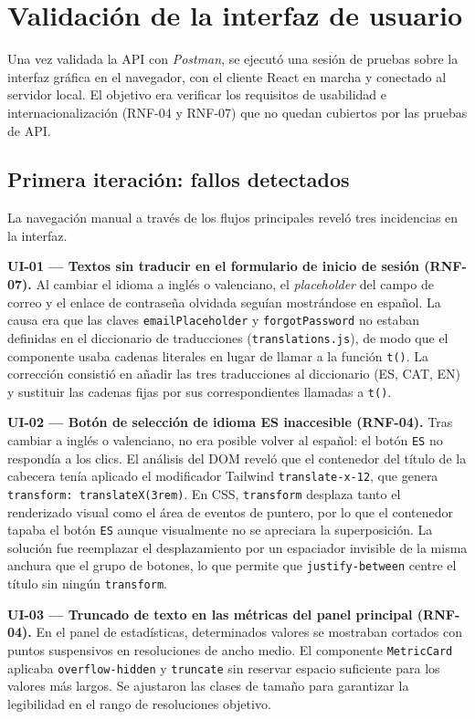 \documentclass[11pt,oneside,spanish,listoffigures,listoftables]{tfgetsinf}
\begin{document}
\section{Validación de la interfaz de usuario}

Una vez validada la API con \textit{Postman}, se ejecutó una sesión de pruebas sobre la interfaz gráfica en el navegador, con el cliente React en marcha y conectado al servidor local. El objetivo era verificar los requisitos de usabilidad e internacionalización (RNF-04 y RNF-07) que no quedan cubiertos por las pruebas de API.

\subsection{Primera iteración: fallos detectados}

La navegación manual a través de los flujos principales reveló tres incidencias en la interfaz.

\textbf{UI-01 — Textos sin traducir en el formulario de inicio de sesión (RNF-07).} Al cambiar el idioma a inglés o valenciano, el \textit{placeholder} del campo de correo y el enlace de contraseña olvidada seguían mostrándose en español. La causa era que las claves \texttt{emailPlaceholder} y \texttt{forgotPassword} no estaban definidas en el diccionario de traducciones (\texttt{translations.js}), de modo que el componente usaba cadenas literales en lugar de llamar a la función \texttt{t()}. La corrección consistió en añadir las tres traducciones al diccionario (ES, CAT, EN) y sustituir las cadenas fijas por sus correspondientes llamadas a \texttt{t()}.

\textbf{UI-02 — Botón de selección de idioma ES inaccesible (RNF-04).} Tras cambiar a inglés o valenciano, no era posible volver al español: el botón \texttt{ES} no respondía a los clics. El análisis del DOM reveló que el contenedor del título de la cabecera tenía aplicado el modificador Tailwind \texttt{translate-x-12}, que genera \texttt{transform: translateX(3rem)}. En CSS, \texttt{transform} desplaza tanto el renderizado visual como el área de eventos de puntero, por lo que el contenedor tapaba el botón \texttt{ES} aunque visualmente no se apreciara la superposición. La solución fue reemplazar el desplazamiento por un espaciador invisible de la misma anchura que el grupo de botones, lo que permite que \texttt{justify-between} centre el título sin ningún \texttt{transform}.

\textbf{UI-03 — Truncado de texto en las métricas del panel principal (RNF-04).} En el panel de estadísticas, determinados valores se mostraban cortados con puntos suspensivos en resoluciones de ancho medio. El componente \texttt{MetricCard} aplicaba \texttt{overflow-hidden} y \texttt{truncate} sin reservar espacio suficiente para los valores más largos. Se ajustaron las clases de tamaño para garantizar la legibilidad en el rango de resoluciones objetivo.
\end{document}
